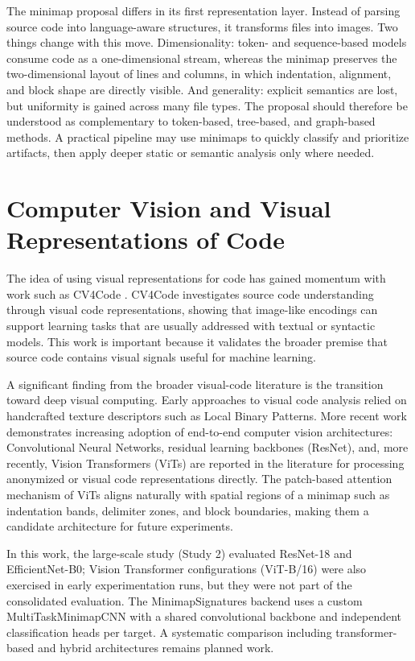 The minimap proposal differs in its first representation layer. Instead of
parsing source code into language-aware structures, it transforms files into
images. Two things change with this move. Dimensionality: token- and
sequence-based models consume code as a one-dimensional stream, whereas the
minimap preserves the two-dimensional layout of lines and columns, in which
indentation, alignment, and block shape are directly visible. And generality:
explicit semantics are lost, but uniformity is gained across many file
types. The proposal should therefore be understood as complementary to
token-based, tree-based, and graph-based methods. A practical pipeline may use
minimaps to quickly classify and prioritize artifacts, then apply deeper static
or semantic analysis only where needed.

\section{Computer Vision and Visual Representations of Code}

The idea of using visual representations for code has gained momentum with work
such as CV4Code \cite{shi2023cv4code}. CV4Code investigates source code
understanding through visual code representations, showing that image-like
encodings can support learning tasks that are usually addressed with textual or
syntactic models. This work is important because it validates the broader
premise that source code contains visual signals useful for machine learning.

A significant finding from the broader visual-code literature is the transition
toward deep visual computing. Early approaches to visual code analysis relied on
handcrafted texture descriptors such as Local Binary Patterns. More recent work
demonstrates increasing adoption of end-to-end computer vision architectures:
Convolutional Neural Networks, residual learning backbones (ResNet), and,
more recently, Vision Transformers (ViTs) are reported in the literature for
processing anonymized or visual code representations directly. The patch-based
attention mechanism of ViTs aligns naturally with spatial regions of a minimap
such as indentation bands, delimiter zones, and block boundaries, making them a
candidate architecture for future experiments.

In this work, the large-scale study (Study 2) evaluated ResNet-18 and
EfficientNet-B0; Vision Transformer configurations (ViT-B/16) were also
exercised in early experimentation runs, but they were not part of the
consolidated evaluation. The MinimapSignatures backend uses a custom
MultiTaskMinimapCNN with a shared convolutional backbone and independent
classification heads per target. A systematic comparison including
transformer-based and hybrid architectures remains planned work.

